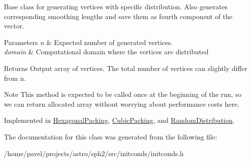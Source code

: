 Base class for generating vertices with specific distribution. Also generates corresponding smoothing lengths and save them as fourth component of the vector. 
\begin{DoxyParams}{Parameters}
{\em n} & Expected number of generated vertices. \\
\hline
{\em domain} & Computational domain where the vertices are distributed \\
\hline
\end{DoxyParams}
\begin{DoxyReturn}{Returns}
Output array of vertices. The total number of vertices can slightly differ from n. 
\end{DoxyReturn}
\begin{DoxyNote}{Note}
This method is expected to be called once at the beginning of the run, so we can return allocated array without worrying about performance costs here. 
\end{DoxyNote}


Implemented in \hyperlink{classHexagonalPacking_a276079137928da5c94f8bb870b038c4a}{Hexagonal\+Packing}, \hyperlink{classCubicPacking_aa3c9a226ffa03b38a7b5fedad1414a01}{Cubic\+Packing}, and \hyperlink{classRandomDistribution_a3e1308d2bb28c5801e6e0537a8002597}{Random\+Distribution}.



The documentation for this class was generated from the following file\+:\begin{DoxyCompactItemize}
\item 
/home/pavel/projects/astro/sph2/src/initconds/initconds.\+h\end{DoxyCompactItemize}
